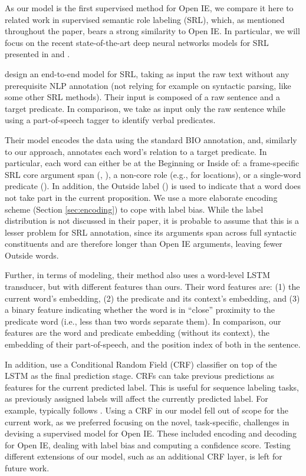 As our model is the first supervised method for Open IE, we compare it here to related work in supervised semantic role labeling (SRL), which, as mentioned throughout the paper,  bears a strong similarity to Open IE.
In particular, we will focus on the recent state-of-the-art deep neural networks models for SRL presented in \cite{baidusrl} and \cite{RothLapata16}.

 design an end-to-end model for SRL, taking as input the raw text
without any prerequisite NLP annotation (not relying for example on 
syntactic parsing, like some other SRL methods).
Their input is composed of a raw sentence and a target predicate.
In comparison, we take as input only the raw sentence while using a part-of-speech tagger to identify verbal predicates.

Their model encodes the data using the standard BIO annotation,
  and, similarly to our approach, annotates each word's relation to
  a target predicate.
  In particular, each word can either be at the Beginning or Inside of: a frame-specific SRL core argument span
  (, ), a non-core role (e.g.,  for locations),
  or a single-word predicate ().
  In addition, the Outside label () is used to indicate that
  a word does not take part in the current proposition.
  We use a more elaborate encoding scheme (Section \ref{sec:encoding}) to cope with label bias.
  While the label distribution is not discussed in their paper,
  it is probable to assume that this is a lesser problem for SRL annotation,
  since its arguments span across full syntactic constituents and are therefore longer than Open IE arguments, leaving fewer Outside words.

  Further, in terms of modeling, their method also uses a word-level LSTM transducer, but with different features than ours.
  Their word features are: (1) the current word's embedding, (2) the predicate and its context's embedding,
  and (3) a binary feature indicating whether the word is in ``close'' proximity to the predicate word (i.e., less than two words separate them).
  In comparison, our features are the word and predicate embedding (without its context), the
  embedding of their part-of-speech, and the position index of both in the sentence.

  In addition,  use a Conditional Random Field (CRF) \cite{crf} classifier on top of
  the LSTM as the final prediction stage.
  CRFs can take previous predictions as features for the current predicted label. This is useful for sequence labeling
  tasks, as previously assigned labels will affect the currently predicted label. For example,  typically follows .
  Using a CRF in our model fell out of scope for the current work, as we preferred focusing
  on the novel, task-specific, challenges in devising a supervised model for Open IE. These included encoding and decoding for Open IE, dealing with label bias and computing a confidence score. Testing different extensions of our model, such as an additional CRF layer, is left for future work.


